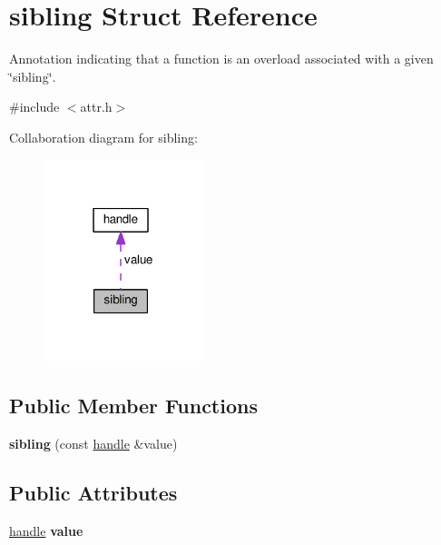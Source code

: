 \hypertarget{structsibling}{}\section{sibling Struct Reference}
\label{structsibling}


Annotation indicating that a function is an overload associated with a given \char`\"{}sibling\char`\"{}.  




{\ttfamily \#include $<$attr.\+h$>$}



Collaboration diagram for sibling\+:
\nopagebreak
\begin{figure}[H]
\begin{center}
\leavevmode
\includegraphics[width=130pt]{structsibling__coll__graph}
\end{center}
\end{figure}
\subsection*{Public Member Functions}
\begin{DoxyCompactItemize}
\item 
{\bfseries sibling} (const \hyperlink{classhandle}{handle} \&value)\hypertarget{structsibling_a5fdaa9f632856bc0c8f8c18c14c48320}{}\label{structsibling_a5fdaa9f632856bc0c8f8c18c14c48320}

\end{DoxyCompactItemize}
\subsection*{Public Attributes}
\begin{DoxyCompactItemize}
\item 
\hyperlink{classhandle}{handle} {\bfseries value}\hypertarget{structsibling_a3e9e0ab053e64c98c3baf8e81572df97}{}\label{structsibling_a3e9e0ab053e64c98c3baf8e81572df97}

\end{DoxyCompactItemize}


